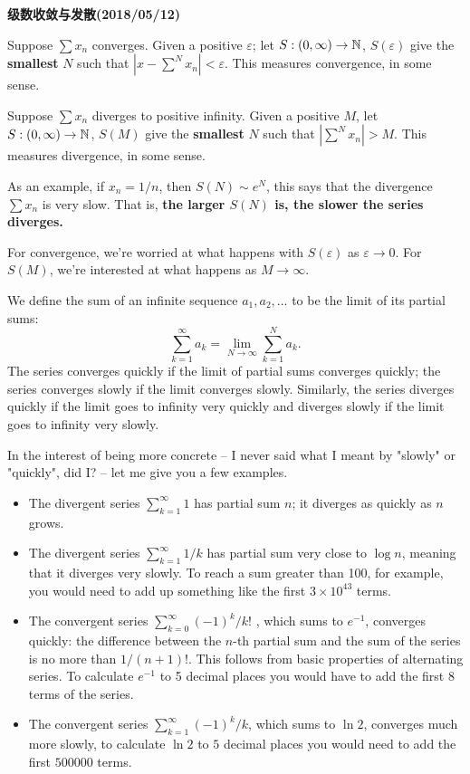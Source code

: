 \documentclass[UTF8, a4paper, 11pt, onecolumn]{article}
\begin{document}
\begin{center}
{\Large {\bf 级数收敛与发散(2018/05/12)}} \\
\end{center}


Suppose $\sum x_n$ converges. Given a positive $\varepsilon$; let $S: (0,\infty)\to \Bbb N$, $S(\varepsilon)$ give the \textbf{smallest} $N$ such that $|x - \sum^N x_n| < \varepsilon$. This measures convergence, in some sense.

Suppose $\sum x_n$ diverges to positive infinity. Given a positive $M$, let $S: (0,\infty)\to \Bbb N$, $S(M)$ give the \textbf{smallest} $N$ such that $|\sum^N x_n|>M$. This measures divergence, in some sense.

As an example, if $x_n=1/n$, then $S(N)\sim e^N$, this says that the divergence $\sum x_n$ is very slow. That is, \textbf{the larger $S(N)$ is, the slower the series diverges.}

For convergence, we're worried at what happens with $S(\varepsilon)$ as $\varepsilon\to 0$. For $S(M)$, we're interested at what happens as $M\to\infty$.


We define the sum of an infinite sequence $a_1,a_2,\dots$ to be the limit of its partial sums:
\begin{equation*}
  \sum_{k=1}^\infty a_k = \lim_{N\to\infty}\sum_{k=1}^N a_k.
\end{equation*}
The series converges quickly if the limit of partial sums converges quickly; the series converges slowly if the limit converges slowly. Similarly, the series diverges quickly if the limit goes to infinity very quickly and diverges slowly if the limit goes to infinity very slowly.

In the interest of being more concrete -- I never said what I meant by "slowly" or "quickly", did I? -- let me give you a few examples.
\begin{itemize}
  \item The divergent series $\sum_{k=1}^\infty 1$ has partial sum $n$; it diverges as quickly as $n$ grows.
  \item The divergent series $\sum_{k=1}^\infty 1/k $ has partial sum very close to $\log n$, meaning that it diverges very slowly. To reach a sum greater than 100, for example, you would need to add up something like the first $3\times10^{43}$ terms.
  \item The convergent series $\sum_{k=0}^\infty (-1)^k/k!$ , which sums to $e^{-1}$, converges quickly: the difference between the $n$-th partial sum and the sum of the series is no more than $1/(n+1)!$. This follows from basic properties of alternating series. To calculate $e^{-1}$ to 5 decimal places you would have to add the first 8 terms of the series.
  \item The convergent series $\sum_{k=1}^\infty (-1)^k/k$, which sums to $\ln 2$, converges much more slowly, to calculate $\ln 2$ to $5$ decimal places you would need to add the first $500000$ terms.
\end{itemize}
\end{document}
